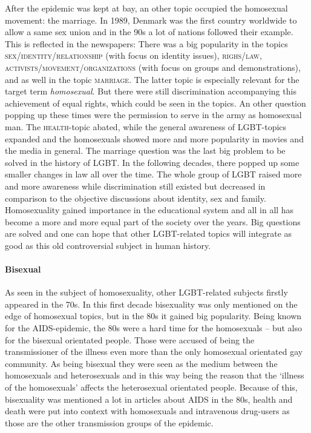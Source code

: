\documentclass[10pt,a4paper,twocolumn]{scrartcl}
\begin{document}
After the epidemic was kept at bay, an other topic occupied the homosexual movement: the marriage. In 1989, Denmark was the first country worldwide to allow a same sex union and in the 90s a lot of nations followed their example. This is reflected in the newspapers: There was a big popularity in the topics \textsc{sex/identity/relationship} (with focus on identity issues), \textsc{righs/law}, \textsc{activists/movement/organizations} (with focus on groups and demonstrations), and as well in the topic \textsc{marriage}. The latter topic is especially relevant for the target term \textit{homosexual}. But there were still discrimination accompanying this achievement of equal rights, which could be seen in the topics. An other question popping up these times were the permission to serve in the army as homosexual man. The \textsc{health}-topic abated, while the general awareness of LGBT-topics expanded and the homosexuals showed more and more popularity in movies and the media in general.
The marriage question was the last big problem to be solved in the history of LGBT. In the following decades, there popped up some smaller changes in law all over the time. The whole group of LGBT raised more and more awareness while discrimination still existed but decreased in comparison to the objective discussions about identity, sex and family. Homosexuality gained importance in the educational system and all in all has become a more and more equal part of the society over the years. Big questions are solved and one can hope that other LGBT-related topics will integrate as good as this old controversial subject in human history.

\paragraph*{Bisexual} As seen in the subject of homosexuality, other LGBT-related subjects firstly appeared in the 70s. In this first decade bisexuality was only mentioned on the edge of homosexual topics, but in the 80s it gained big popularity. Being known for the AIDS-epidemic, the 80s were a hard time for the homosexuals – but also for the bisexual orientated people. Those were accused of being the transmissioner of the illness even more than the only homosexual orientated gay community. As being bisexual they were seen as the medium between the homosexuals and heterosexuals and in this way being the reason that the `illness of the homosexuals' affects the heterosexual orientated people. Because of this, bisexuality was mentioned a lot in articles about AIDS in the 80s, health and death were put into context with homosexuals and intravenous drug-users as those are the other transmission groups of the epidemic.
\end{document}
